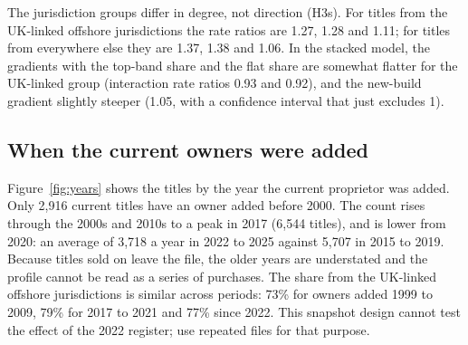 \documentclass[11pt,a4paper]{article}
\begin{document}
\begin{table}[tbp]\centering\footnotesize\caption{Overseas-company titles per dwelling and the housing stock of the LSOA: incidence rate ratios per 10 percentage points [95\% CI]. PPML with district fixed effects (district by jurisdiction group in the interaction model), offset log dwellings, standard errors clustered by district. Univariate: each share alone. UK-linked and Elsewhere: titles from those jurisdiction groups only. Interaction: ratio of the UK-linked to the Elsewhere gradient in a stacked model. Districts with no titles in a group drop out of that model.}\label{tab:main}\end{table}

The jurisdiction groups differ in degree, not direction (H3s). For titles from the UK-linked offshore jurisdictions the rate ratios are 1.27, 1.28 and 1.11; for titles from everywhere else they are 1.37, 1.38 and 1.06. In the stacked model, the gradients with the top-band share and the flat share are somewhat flatter for the UK-linked group (interaction rate ratios 0.93 and 0.92), and the new-build gradient slightly steeper (1.05, with a confidence interval that just excludes 1).

\subsection{When the current owners were added}
Figure~\ref{fig:years} shows the titles by the year the current proprietor was added. Only 2,916 current titles have an owner added before 2000. The count rises through the 2000s and 2010s to a peak in 2017 (6,544 titles), and is lower from 2020: an average of 3,718 a year in 2022 to 2025 against 5,707 in 2015 to 2019. Because titles sold on leave the file, the older years are understated and the profile cannot be read as a series of purchases. The share from the UK-linked offshore jurisdictions is similar across periods: 73\% for owners added 1999 to 2009, 79\% for 2017 to 2021 and 77\% since 2022. This snapshot design cannot test the effect of the 2022 register; \citet{collin2025} use repeated files for that purpose.
\end{document}
